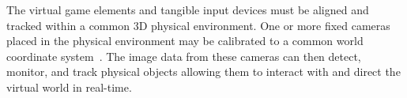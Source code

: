 \documentclass[10pt,twocolumn,letterpaper]{article}
\begin{document}
The virtual game elements and tangible input devices must be aligned
and tracked within a common 3D physical environment.  
%
%
One or more fixed cameras placed in the physical environment may be
calibrated to a common world coordinate system~\cite{Zhang2000}.
%
%
%
The image data from these cameras can then detect, monitor, and track
physical objects allowing them to interact with and direct the virtual
world in real-time.
\end{document}
